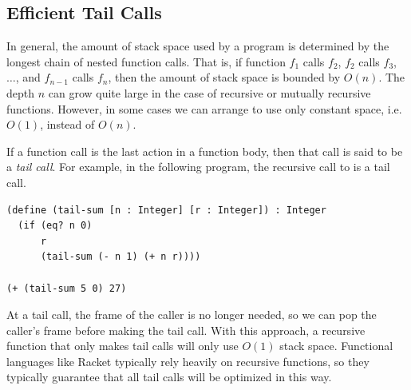\documentclass[11pt]{book}
\newcommand{\ocaml}[1]{{\color{blue}{#1}}}
\begin{document}

\subsection{Efficient Tail Calls}
\label{sec:tail-call}


In general, the amount of stack space used by a program is determined
by the longest chain of nested function calls. That is, if function
$f_1$ calls $f_2$, $f_2$ calls $f_3$, $\ldots$, and $f_{n-1}$ calls
$f_n$, then the amount of stack space is bounded by $O(n)$.  The depth
$n$ can grow quite large in the case of recursive or mutually
recursive functions. However, in some cases we can arrange to use only
constant space, i.e. $O(1)$, instead of $O(n)$.

If a function call is the last action in a function body, then that
call is said to be a \emph{tail call}.
For example, in the following
program, the recursive call to  is a tail call.
\begin{center}
\begin{lstlisting}
(define (tail-sum [n : Integer] [r : Integer]) : Integer
  (if (eq? n 0) 
      r
      (tail-sum (- n 1) (+ n r))))

(+ (tail-sum 5 0) 27)
\end{lstlisting}
\end{center}
At a tail call, the frame of the caller is no longer needed, so we
can pop the caller's frame before making the tail call. With this
approach, a recursive function that only makes tail calls will only
use $O(1)$ stack space.  Functional languages like Racket typically
rely heavily on recursive functions, so they typically guarantee that
all tail calls will be optimized in this way.
\ocaml{For simplicity, we will not implement the tail call optimization
  described here. While functional languages often depend
  on this optimization (Scheme and its dialects typically demand that
  a conforming implementation perform it), imperative languages with loops
  can be more flexible.}
\end{document}
